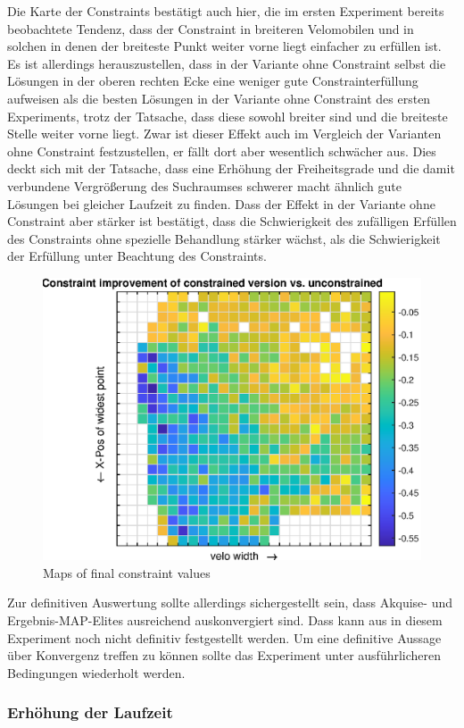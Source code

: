 Die Karte der Constraints bestätigt auch hier, die im ersten Experiment bereits beobachtete Tendenz, dass der Constraint in breiteren Velomobilen und in solchen in denen der breiteste Punkt weiter vorne liegt einfacher zu erfüllen ist.
Es ist allerdings herauszustellen, dass in der Variante ohne Constraint selbst die Lösungen in der oberen rechten Ecke eine weniger gute Constrainterfüllung aufweisen als die besten Lösungen in der Variante ohne Constraint des ersten Experiments, trotz der Tatsache, dass diese sowohl breiter sind und die breiteste Stelle weiter vorne liegt.
Zwar ist dieser Effekt auch im Vergleich der Varianten ohne Constraint festzustellen, er fällt dort aber wesentlich schwächer aus.
Dies deckt sich mit der Tatsache, dass eine Erhöhung der Freiheitsgrade und die damit verbundene Vergrößerung des Suchraumses schwerer macht ähnlich gute Lösungen bei gleicher Laufzeit zu finden.
Dass der Effekt in der Variante ohne Constraint aber stärker ist bestätigt, dass die Schwierigkeit des zufälligen Erfüllen des Constraints ohne spezielle Behandlung stärker wächst, als die Schwierigkeit der Erfüllung unter Beachtung des Constraints.

\begin{figure}[h]
	\centering
	\includegraphics[width=.7\linewidth]{bilder/6pt500Samples/constraintImprovements}
	\caption{Maps of final constraint values}
	\label{fig:2ndmapConCompare}
\end{figure}

Zur definitiven Auswertung sollte allerdings sichergestellt sein, dass Akquise- und Ergebnis-MAP-Elites ausreichend auskonvergiert sind.
Dass kann aus in diesem Experiment noch nicht definitiv festgestellt werden.
Um eine definitive Aussage über Konvergenz treffen zu können sollte das Experiment unter ausführlicheren Bedingungen wiederholt werden.

\subsubsection{Erhöhung der Laufzeit}

